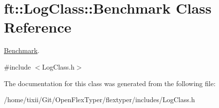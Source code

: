 \hypertarget{classft_1_1LogClass_1_1Benchmark}{}\section{ft\+:\+:Log\+Class\+:\+:Benchmark Class Reference}
\label{classft_1_1LogClass_1_1Benchmark}


\hyperlink{classft_1_1LogClass_1_1Benchmark}{Benchmark}.  




{\ttfamily \#include $<$Log\+Class.\+h$>$}



The documentation for this class was generated from the following file\+:\begin{DoxyCompactItemize}
\item 
/home/tixii/\+Git/\+Open\+Flex\+Typer/flextyper/includes/Log\+Class.\+h\end{DoxyCompactItemize}
